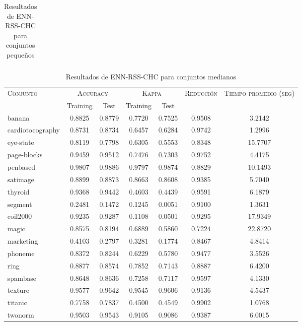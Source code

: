 \begin{table}[]
\begin{tabular}{l c c c c c c}
\hline
\end{tabular}
\caption{Resultados de ENN-RSS-CHC para conjuntos pequeños }
\label{res-peq-ENN-RSS-CHC}
\end{table}


\begin{table}[]
\centering
\begin{tabular}{l c c c c c c}
\hline
\multirow{2}{*}{\textsc{Conjunto}}
	& \multicolumn{2}{c}{\textsc{Accuracy}}
	& \multicolumn{2}{c}{\textsc{Kappa}}
	& \textsc{Reducción}
	& \textsc{Tiempo promedio (seg)} \\
	& Training & Test
	& Training & Test \\ 
\hline
\hline

banana & 0.8825 & 0.8779 & 0.7720 & 0.7525 & 0.9508 & 3.2142 \\
cardiotocography & 0.8731 & 0.8734 & 0.6457 & 0.6284 & 0.9742 & 1.2996 \\
eye-state & 0.8119 & 0.7798 & 0.6305 & 0.5553 & 0.8348 &  15.7707 \\
page-blocks & 0.9459 & 0.9512 & 0.7476 & 0.7303 & 0.9752 & 4.4175 \\
penbased & 0.9807 & 0.9886 & 0.9797 & 0.9874 & 0.8829 & 10.1493 \\
satimage & 0.8899 & 0.8873 & 0.8663 & 0.8608 & 0.9385 & 5.7040 \\
thyroid & 0.9368 & 0.9442 & 0.4603 & 0.4439 & 0.9591 & 6.1879 \\
segment & 0.2481 & 0.1472 & 0.1245 & 0.0051 & 0.9100 & 1.3631 \\
coil2000 & 0.9235 & 0.9287 & 0.1108 & 0.0501 & 0.9295 &  17.9349 \\
magic & 0.8575 & 0.8194 & 0.6889 & 0.5860 & 0.7224 &  22.8720 \\
marketing & 0.4103 & 0.2797 & 0.3281 & 0.1774 & 0.8467 & 4.8414 \\
phoneme & 0.8372 & 0.8244 & 0.6229 & 0.5780 & 0.9477 & 3.5526 \\
ring & 0.8877 & 0.8574 & 0.7852 & 0.7143 & 0.8887 & 6.4200 \\
spambase & 0.8648 & 0.8636 & 0.7258 & 0.7117 & 0.9597 & 4.1330 \\
texture & 0.9577 & 0.9642 & 0.9545 & 0.9606 & 0.9136 & 4.5437 \\
titanic & 0.7758 & 0.7837 & 0.4500 & 0.4549 & 0.9902 & 1.0768 \\
twonorm & 0.9503 & 0.9543 & 0.9105 & 0.9086 & 0.9387 & 6.0015 \\

\hline
\end{tabular}
\caption{Resultados de ENN-RSS-CHC para conjuntos medianos }
\label{res-med-ENN-RSS-CHC}
\end{table}


